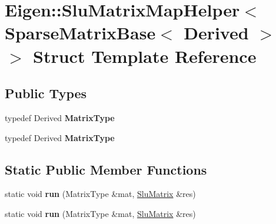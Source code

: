 \hypertarget{struct_eigen_1_1_slu_matrix_map_helper_3_01_sparse_matrix_base_3_01_derived_01_4_01_4}{}\section{Eigen\+:\+:Slu\+Matrix\+Map\+Helper$<$ Sparse\+Matrix\+Base$<$ Derived $>$ $>$ Struct Template Reference}
\label{struct_eigen_1_1_slu_matrix_map_helper_3_01_sparse_matrix_base_3_01_derived_01_4_01_4}
\subsection*{Public Types}
\begin{DoxyCompactItemize}
\item 
\mbox{\label{struct_eigen_1_1_slu_matrix_map_helper_3_01_sparse_matrix_base_3_01_derived_01_4_01_4_ab8e2343033878cdec662fc965bbd7e24}} 
typedef Derived {\bfseries Matrix\+Type}
\item 
\mbox{\label{struct_eigen_1_1_slu_matrix_map_helper_3_01_sparse_matrix_base_3_01_derived_01_4_01_4_ab8e2343033878cdec662fc965bbd7e24}} 
typedef Derived {\bfseries Matrix\+Type}
\end{DoxyCompactItemize}
\subsection*{Static Public Member Functions}
\begin{DoxyCompactItemize}
\item 
\mbox{\label{struct_eigen_1_1_slu_matrix_map_helper_3_01_sparse_matrix_base_3_01_derived_01_4_01_4_ad1ab651e660a66310c7ba2ef7956ac99}} 
static void {\bfseries run} (Matrix\+Type \&mat, \hyperlink{struct_eigen_1_1_slu_matrix}{Slu\+Matrix} \&res)
\item 
\mbox{\label{struct_eigen_1_1_slu_matrix_map_helper_3_01_sparse_matrix_base_3_01_derived_01_4_01_4_ad1ab651e660a66310c7ba2ef7956ac99}} 
static void {\bfseries run} (Matrix\+Type \&mat, \hyperlink{struct_eigen_1_1_slu_matrix}{Slu\+Matrix} \&res)
\end{DoxyCompactItemize}


